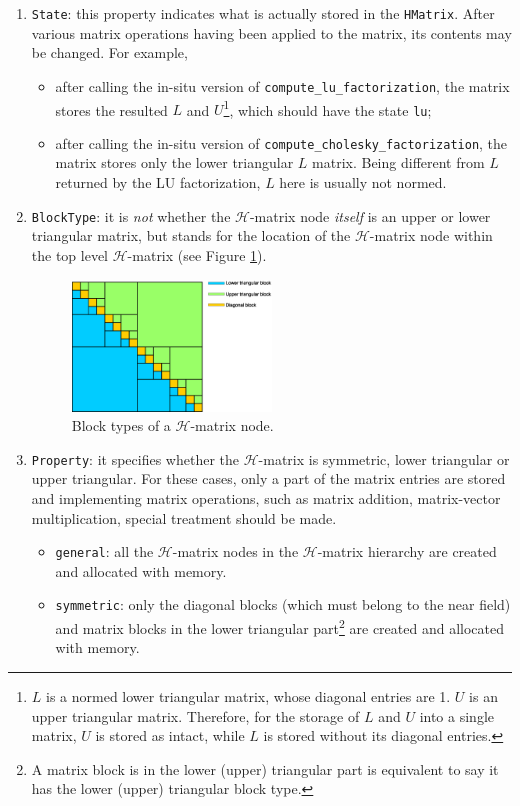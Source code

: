 \documentclass[11pt, a4paper]{book}
\begin{document}
\begin{enumerate}
\item \texttt{State}: this property indicates what is actually stored in the
  \texttt{HMatrix}. After various matrix operations having been applied to the matrix, its
  contents may be changed. For example,
  \begin{itemize}
  \item after calling the in-situ version of \texttt{compute\_lu\_factorization}, the
    matrix stores the resulted $L$ and $U$\footnote{$L$ is a normed lower triangular
      matrix, whose diagonal entries are 1. $U$ is an upper triangular matrix. Therefore,
      for the storage of $L$ and $U$ into a single matrix, $U$ is stored as intact, while
      $L$ is stored without its diagonal entries.}, which should have the state
    \texttt{lu};
  \item after calling the in-situ version of \texttt{compute\_cholesky\_factorization},
    the matrix stores only the lower triangular $L$ matrix. Being different from $L$
    returned by the LU factorization, $L$ here is usually not normed.
  \end{itemize}
\item \texttt{BlockType}: it is \emph{not} whether the $\mathcal{H}$-matrix node \emph{itself} is
  an upper or lower triangular matrix, but stands for the location of the
  $\mathcal{H}$-matrix node within the top level $\mathcal{H}$-matrix (see Figure
  \ref{fig:hmat-node-block-types}).
  \begin{figure}[htbp]
    \centering
    \includegraphics[width=0.5\textwidth, height=\textheight, keepaspectratio]{figures/2023-01-23-hmat-block-type.eps}
    \caption{Block types of a $\mathcal{H}$-matrix node.}
    \label{fig:hmat-node-block-types}
  \end{figure}
\item \texttt{Property}: it specifies whether the $\mathcal{H}$-matrix is symmetric, lower
  triangular or upper triangular. For these cases, only a part of the matrix entries are
  stored and implementing matrix operations, such as matrix addition, matrix-vector
  multiplication, special treatment should be made.
  \begin{itemize}
  \item \texttt{general}: all the $\mathcal{H}$-matrix nodes in the $\mathcal{H}$-matrix
    hierarchy are created and allocated with memory.
  \item \texttt{symmetric}: only the diagonal blocks (which must belong to the near field)
    and matrix blocks in the lower triangular part\footnote{A matrix block is in the lower
      (upper) triangular part is equivalent to say it has the lower (upper) triangular
      block type.} are created and allocated with memory.


\end{itemize}
\end{enumerate}
\end{document}
